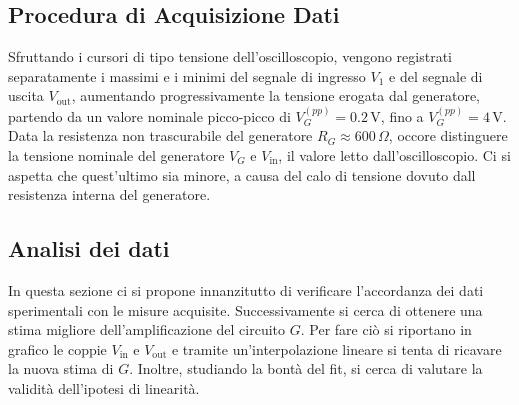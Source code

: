 \documentclass[a4paper,11pt]{article}
\begin{document}
\subsection{Procedura di Acquisizione Dati }
Sfruttando i cursori di tipo tensione dell'oscilloscopio, vengono registrati separatamente
i massimi e i minimi del segnale di ingresso $V_{1}$ e del segnale di uscita $V_{\text{out}}$,
aumentando progressivamente la tensione erogata dal generatore, partendo da un valore nominale
picco-picco di $V_{G}^{(pp)}=0.2 \, \si{\volt}$, fino a $V_{G}^{(pp)}=4 \, \si{\volt}$.
Data la resistenza non trascurabile del generatore $R_{G}\approx 600 \,\Omega$, occore
distinguere la tensione nominale del generatore $V_{G}$ e $V_{\text{in}}$, il valore letto
dall'oscilloscopio. Ci si aspetta che quest'ultimo sia minore, a causa del calo di tensione
dovuto dall resistenza interna del generatore.

\subsection{Analisi dei dati}
In questa sezione ci si propone innanzitutto di verificare l'accordanza dei dati sperimentali
con le misure acquisite. Successivamente si cerca di ottenere una stima migliore
dell'amplificazione del circuito $G$. Per fare ciò si riportano in grafico le coppie $V_{\text{in}}$ e
$V_{\text{out}}$ e tramite un'interpolazione lineare si tenta di ricavare la nuova stima di $G$.
Inoltre, studiando la bontà del fit, si cerca di valutare la validità dell'ipotesi di linearità.
\end{document}
